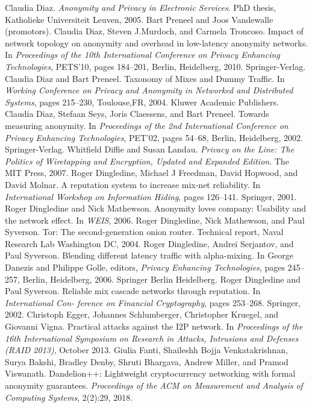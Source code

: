 \documentclass{article}
\begin{document}
\begin{thebibliography}{200}
Claudia Diaz. \emph{Anonymity and Privacy in Electronic Services}. PhD thesis, Katholieke Universiteit Leuven, 2005. Bart Preneel and Joos Vandewalle (promotors).
Claudia Diaz, Steven J.Murdoch, and Carmela Troncoso. Impact of network topology on anonymity and overhead in low-latency anonymity networks. In \emph{Proceedings of the 10th International Conference on Privacy Enhancing Technologies}, PETS'10, pages 184–201, Berlin, Heidelberg, 2010. Springer-Verlag.
Claudia Diaz and Bart Preneel. Taxonomy of Mixes and Dummy Traffic. In \emph{Working Conference on Privacy and Anonymity in Networked and Distributed Systems}, pages 215–230, Toulouse,FR, 2004. Kluwer Academic Publishers.
Claudia Diaz, Stefaan Seys, Joris Claessens, and Bart Preneel. Towards measuring anonymity. In \emph{Proceedings of the 2nd International Conference on Privacy Enhancing Technologies}, PET’02, pages 54–68, Berlin, Heidelberg, 2002. Springer-Verlag.
Whitfield Diffie and Susan Landau. \emph{Privacy on the Line: The Politics of Wiretapping and Encryption, Updated and Expanded Edition}. The MIT Press, 2007.
Roger Dingledine, Michael J Freedman, David Hopwood, and David Molnar. A reputation system to increase mix-net reliability. In \emph{International Workshop on Information Hiding}, pages 126–141. Springer, 2001.
Roger Dingledine and Nick Mathewson. Anonymity loves company: Usability and the network effect. In \emph{WEIS}, 2006.
Roger Dingledine, Nick Mathewson, and Paul Syverson. Tor: The second-generation onion router. Technical report, Naval Research Lab Washington DC, 2004.
Roger Dingledine, Andrei Serjantov, and Paul Syverson. Blending different latency traffic with alpha-mixing. In George Danezis and Philippe Golle, editors, \emph{Privacy Enhancing Technologies}, pages 245–257, Berlin, Heidelberg, 2006. Springer Berlin Heidelberg.
Roger Dingledine and Paul Syverson. Reliable mix cascade networks through reputation. In \emph{International Con- ference on Financial Cryptography}, pages 253–268. Springer, 2002.
Christoph Egger, Johannes Schlumberger, Christopher Kruegel, and Giovanni Vigna. Practical attacks against the I2P network. In \emph{Proceedings of the 16th International Symposium on Research in Attacks, Intrusions and Defenses (RAID 2013)}, October 2013.
Giulia Fanti, Shaileshh Bojja Venkatakrishnan, Surya Bakshi, Bradley Denby, Shruti Bhargava, Andrew Miller, and Pramod Viswanath. Dandelion++: Lightweight cryptocurrency networking with formal anonymity guarantees. \emph{Proceedings of the ACM on Measurement and Analysis of Computing Systems}, 2(2):29, 2018.

\end{thebibliography}
\end{document}
